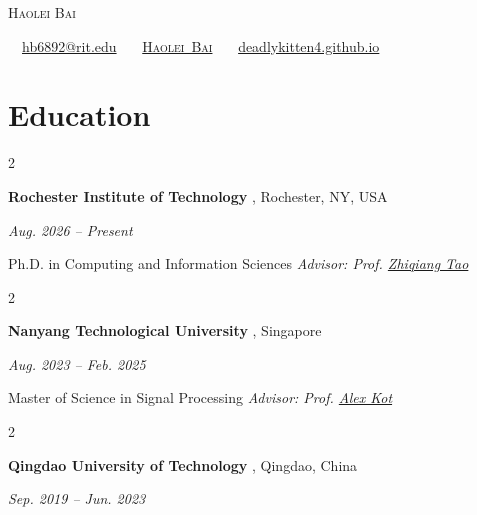 \documentclass[10pt, letterpaper]{article}
\newcommand{\institution}[1]{%
    {\fontsize{10.8pt}{13pt}\selectfont\bfseries #1}%
}
\newcommand{\entrydate}[1]{%
    {\small\itshape #1}%
}
\newcommand{\advisor}[1]{%
    {\small\itshape Advisor: #1}%
}
\newenvironment{twocolentry}[2][]{
    \onecolentry
    \def\secondColumn{#2}
    \setcolumnwidth{\fill,4cm}
    \begin{paracol}{2}
}{
    \switchcolumn
    \raggedleft
    \secondColumn
    \end{paracol}
    \endonecolentry
}
\newenvironment{header}{
    \setlength{\topsep}{0pt}
    \par\kern\topsep
    \centering
    \linespread{1.5}
}{
    \par\kern\topsep
}
\begin{document}
\begin{header}
    \fontsize{25pt}{25pt}\selectfont\textsc{Haolei Bai}

    \vspace{5pt}

    \normalsize
    \mbox{%
        \faEnvelope\ \href{mailto:hb6892@rit.edu}{hb6892@rit.edu}
        \,\textbar\,
        \aiGoogleScholar\ \href{https://scholar.google.com/citations?user=CGh99DUAAAAJ\&hl=en}{\textsc{Haolei Bai}}
        \,\textbar\,
        \faGlobe\ \href{https://deadlykitten4.github.io/}{deadlykitten4.github.io}
    }
\end{header}

\vspace{5pt-0.3cm}

\section{Education}

\begin{twocolentry}{
    \entrydate{Aug. 2026 -- Present}
}
    \institution{Rochester Institute of Technology}, Rochester, NY, USA
\end{twocolentry}

\vspace{0.08cm}

\hspace{0.10cm}%
Ph.D. in Computing and Information Sciences
\quad
\advisor{Prof. \href{https://scholar.google.com/citations?user=sEKglOkAAAAJ\&hl=en}{Zhiqiang Tao}}

\vspace{0.18cm}

\begin{twocolentry}{
    \entrydate{Aug. 2023 -- Feb. 2025}
}
    \institution{Nanyang Technological University}, Singapore
\end{twocolentry}

\vspace{0.08cm}

\hspace{0.10cm}%
Master of Science in Signal Processing
\quad
\advisor{Prof. \href{https://scholar.google.com/citations?user=UGZXLxIAAAAJ\&hl=en}{Alex Kot}}

\vspace{0.18cm}

\begin{twocolentry}{
    \entrydate{Sep. 2019 -- Jun. 2023}
}
    \institution{Qingdao University of Technology}, Qingdao, China
\end{twocolentry}
\end{document}
